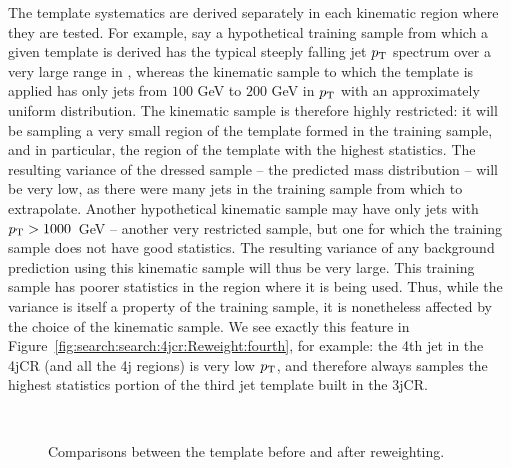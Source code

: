 The template systematics are derived separately in each kinematic region where they are tested. For example, say a hypothetical training sample from which a given template is derived has the typical steeply falling jet $p_{\text{T}}$ spectrum over a very large range in \pT, whereas the kinematic sample to which the template is applied has only jets from $100$ GeV to $200$ GeV in $p_{\text{T}}$ with an approximately uniform distribution. The kinematic sample is therefore highly restricted: it will be sampling a very small region of the template formed in the training sample, and in particular, the region of the template with the highest statistics. The resulting variance of the dressed sample -- the predicted mass distribution -- will be very low, as there were many jets in the training sample from which to extrapolate. Another hypothetical kinematic sample may have only jets with $p_{\text{T}} > 1000$~GeV -- another very restricted sample, but one for which the training sample does not have good statistics. The resulting variance of any background prediction using this kinematic sample will thus be very large. This training sample has poorer statistics in the region where it is being used. Thus, while the variance is itself a property of the training sample, it is nonetheless affected by the choice of the kinematic sample. We see exactly this feature in Figure~\ref{fig:search:search:4jcr:Reweight:fourth}, for example: the 4th jet in the 4jCR (and all the 4j regions) is very low $p_{\text{T}}$, and therefore always samples the highest statistics portion of the third jet template built in the 3jCR. 

\begin{figure}[!ht]
  \centering
  
  \\
    
  \caption{Comparisons between the template before and after reweighting.}
           
           
  \label{fig:search:search:4jcr:Reweight}
\end{figure}
%


